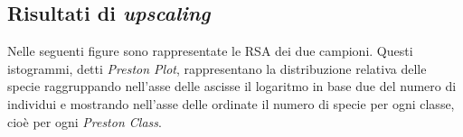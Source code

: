 
\subsection{Risultati di \emph{upscaling}}
Nelle seguenti figure sono rappresentate le RSA dei due campioni. Questi istogrammi, detti \emph{Preston Plot}, rappresentano la distribuzione relativa delle specie raggruppando nell'asse delle ascisse il logaritmo in base due del numero di individui e mostrando nell'asse delle ordinate il numero di specie per ogni classe, cioè per ogni \emph{Preston Class}. 


